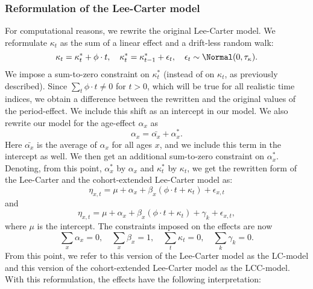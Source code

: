 \subsubsection{Reformulation of the Lee-Carter model}
For computational reasons, we rewrite the original Lee-Carter model. We reformulate $\kappa_t$ as the sum of a linear effect and a drift-less random walk:
\begin{equation}
    \kappa_t = \kappa_t^* + \phi\cdot t, \quad \kappa_t^* = \kappa_{t-1}^* + \epsilon_t, \quad \epsilon_t \sim \Normal(0,\tau_{\kappa}).
\end{equation}
We impose a sum-to-zero constraint on $\kappa_t^*$ (instead of on $\kappa_t$, as previously described). Since $\sum_t \phi \cdot t \neq 0$ for $t > 0$, which will be true for all realistic time indices, we obtain a difference between the rewritten and the original values of the period-effect. We include this shift as an intercept in our model. We also rewrite our model for the age-effect $\alpha_x$ as 
\begin{equation}
    \alpha_x = \bar{\alpha_x} + \alpha_x^*.
\end{equation}
Here $\bar{\alpha_x}$ is the average of $\alpha_x$ for all ages $x$, and we include this term in the intercept as well. We then get an additional sum-to-zero constraint on $\alpha_x^*$. Denoting, from this point, $\alpha_x^*$ by $\alpha_x$ and $\kappa_t^*$ by $\kappa_t$, we get the rewritten form of the Lee-Carter and the cohort-extended Lee-Carter model as:
\begin{equation}
    \eta_{x,t} = \mu + \alpha_x + \beta_x(\phi \cdot t + \kappa_t) + \epsilon_{x,t}
    \label{eq:LC-rewritten}
\end{equation}
and
\begin{equation}
    \eta_{x,t} = \mu + \alpha_x + \beta_x(\phi \cdot t + \kappa_t) + \gamma_k + \epsilon_{x,t},
    \label{eq:LCC-rewritten}
\end{equation}
where $\mu$ is the intercept. The constraints imposed on the effects are now
\begin{equation}
    \sum_x \alpha_x = 0, \quad \sum_x \beta_x = 1, \quad \sum_t \kappa_t = 0,\quad \sum_k \gamma_k = 0. 
    \label{eq:LCconstraintsFinal}
\end{equation}
From this point, we refer to this version of the Lee-Carter model as the LC-model and this version of the cohort-extended Lee-Carter model as the LCC-model. With this reformulation, the effects have the following interpretation:
